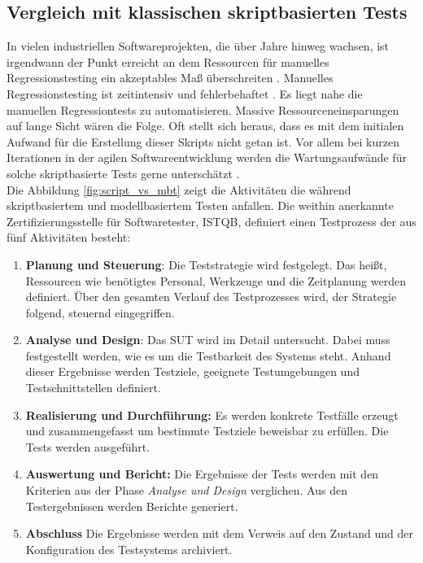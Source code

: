\subsection{Vergleich mit klassischen skriptbasierten Tests}
In vielen industriellen Softwareprojekten, die über Jahre hinweg wachsen, ist irgendwann der Punkt erreicht an dem Ressourcen für manuelles Regressionstesting ein akzeptables Maß überschreiten \cite{graham_experiences_2012}. Manuelles Regressionstesting ist zeitintensiv und fehlerbehaftet \cite{utting_practical_2007}. Es liegt nahe die manuellen Regressiontests zu automatisieren. Massive Ressourceneinsparungen auf lange Sicht wären die Folge. Oft stellt sich heraus, dass es mit dem initialen Aufwand für die Erstellung dieser Skripts nicht getan ist. Vor allem bei kurzen Iterationen in der agilen Softwareentwicklung werden die Wartungsaufwände für solche skriptbasierte Tests gerne unterschätzt \cite{graham_experiences_2012}.\\
Die Abbildung \ref{fig:script_vs_mbt} zeigt die Aktivitäten die während skriptbasiertem und modellbasiertem Testen anfallen. Die weithin anerkannte Zertifizierungsstelle für Softwaretester, \Gls{ISTQB}, definiert einen Testprozess \cite{spillner_basiswissen_2012} der aus fünf Aktivitäten besteht:

\begin{enumerate}
\item \textbf{Planung und Steuerung}: Die Teststrategie wird festgelegt. Das heißt, Ressourcen wie benötigtes Personal, Werkzeuge und die Zeitplanung werden definiert. Über den gesamten Verlauf des Testprozesses wird, der Strategie folgend, steuernd eingegriffen.
\item \textbf{Analyse und Design}: Das \Gls{SUT} wird im Detail untersucht. Dabei muss festgestellt werden, wie es um die Testbarkeit des Systems steht. Anhand dieser Ergebnisse werden Testziele, geeignete Testumgebungen und Testschnittstellen definiert.
\item \textbf{Realisierung und Durchführung:} Es werden konkrete Testfälle erzeugt und zusammengefasst um bestimmte Testziele beweisbar zu erfüllen. Die Tests werden ausgeführt.
\item \textbf{Auswertung und Bericht:} Die Ergebnisse der Tests werden mit den Kriterien aus der Phase \textit{Analyse und Design} verglichen. Aus den Testergebnissen werden Berichte generiert.
\item \textbf{Abschluss} Die Ergebnisse werden mit dem Verweis auf den Zustand und der Konfiguration des Testsystems archiviert.
\end{enumerate}


